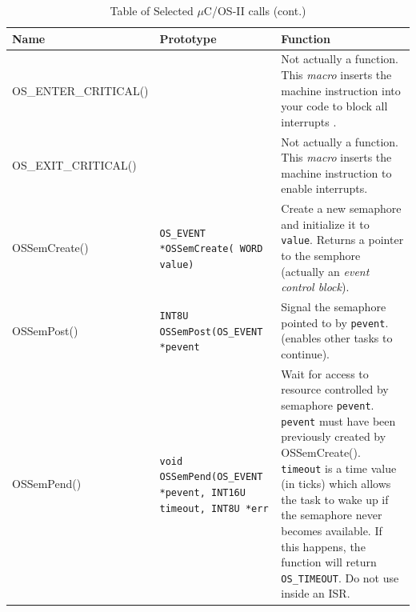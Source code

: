 \begin{table}
\begin{center}
  \begin{tabular}{|l|p{1.6in}|p{2.75in} |}
  \hline
Name   &  Prototype  &  Function \\ \hline
OS\_ENTER\_CRITICAL()   & {\tt }        &
                Not actually a function.  This {\it macro} inserts
                the machine instruction into
                your code to block all interrupts .      \\ \hline
OS\_EXIT\_CRITICAL()    & {\tt }        &
                Not actually a function.  This {\it macro} inserts
                the machine instruction to enable interrupts. \\ \hline
OSSemCreate()   & {\tt OS\_EVENT *OSSemCreate( WORD value)}     &
                Create a new semaphore and initialize it to
                {\tt value}. Returns a pointer to the semphore
                (actually an {\it event control block}).  \\ \hline
OSSemPost()     & {\tt INT8U OSSemPost(OS\_EVENT *pevent }      &
                Signal the semaphore pointed to by {\tt pevent}.
                (enables other tasks to continue).   \\ \hline
OSSemPend()     & {\tt void OSSemPend(OS\_EVENT *pevent, INT16U timeout, INT8U *err }   &
                Wait for access to resource controlled by semaphore {\tt pevent}.
                {\tt pevent} must have been previously created by
                OSSemCreate(). {\tt timeout} is a time value (in ticks)
                which allows the task to wake up  if the semaphore
                never becomes available.  If this happens, the
                function will return {\tt OS\_TIMEOUT}. Do not use inside
                an ISR.   \\ \hline

 \end{tabular}

\caption{Table of Selected $\mu$C/OS-II calls (cont.)}
\label{Ta:FC1}
\end{center}
\end{table}




\newpage	%
